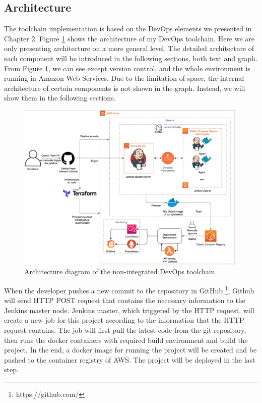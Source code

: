 \subsection{Architecture}
The toolchain implementation is based on the DevOps elements we presented in Chapter 2. Figure \ref{fig:archjenkins} shows the architecture of my DevOps toolchain. Here we are only presenting architecture on a more general level. The detailed architecture of each component will be introduced in the following sections, both text and graph. From Figure \ref{fig:archjenkins}, we can see except version control, and the whole environment is running in Amazon Web Services. Due to the limitation of space, the internal architecture of certain components is not shown in the graph. Instead, we will show them in the following sections.
\begin{figure}[!h]
     \centering
     \includegraphics[width=0.99\textwidth]{pics/arch-med-jenkins.png}
     \caption{Architecture diagram of the non-integrated DevOps toolchain}
     \label{fig:archjenkins}
\end{figure}
\par
When the developer pushes a new commit to the repository in GitHub \footnote{https://github.com/}, Github will send HTTP POST request that contains the necessary information to the Jenkins master node. Jenkins master, which triggered by the HTTP request, will create a new job for this project according to the information that the HTTP request contains. The job will first pull the latest code from the git repository, then runs the docker containers with required build environment and build the project. In the end, a docker image for running the project will be created and be pushed to the container registry of AWS. The project will be deployed in the last step.
